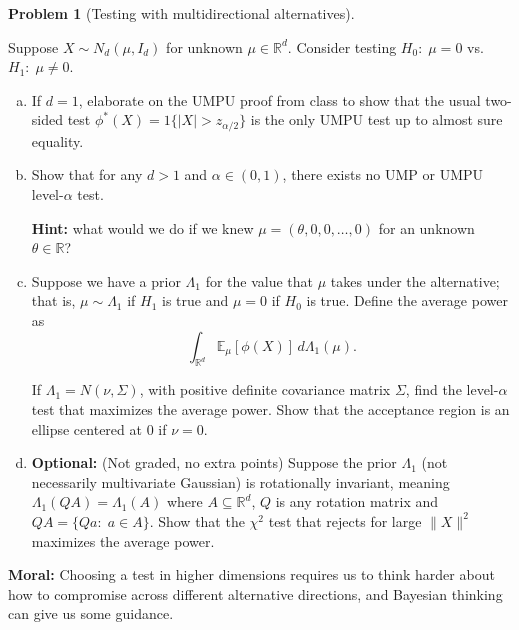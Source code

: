 \documentclass{article}
\newcommand{\EE}{\mathbb{E}}
\newcommand{\RR}{\mathbb{R}}
\newcommand{\optional}{{\bf Optional:} (Not graded, no extra points) }
\theoremstyle{definition}
\newtheorem{problem}{Problem}
\begin{document}
\begin{problem}[Testing with multidirectional alternatives]
\label{prob:test-multidir}

Suppose $X\sim N_d(\mu,I_d)$ for unknown $\mu\in\RR^d$. Consider testing $H_0:\; \mu=0$ vs. $H_1:\; \mu \neq 0$. 

\begin{enumerate}[(a)]

\item If $d=1$, elaborate on the UMPU proof from class to show that the usual two-sided test $\phi^*(X) = 1\{|X| > z_{\alpha/2}\}$ is the only UMPU test up to almost sure equality.

  
  
\item Show that for any $d>1$ and $\alpha\in(0,1)$, there exists no UMP or UMPU level-$\alpha$ test.

{\bf Hint:} what would we do if we knew $\mu = (\theta,0,0,\ldots,0)$ for an unknown $\theta\in\RR$?




\item Suppose we have a prior $\Lambda_1$ for the value that $\mu$ takes under the alternative; that is, $\mu \sim \Lambda_1$ if $H_1$ is true and $\mu = 0$ if $H_0$ is true. Define the average power as
\[
\int_{\RR^d} \EE_\mu [\phi(X)] \,d\Lambda_1(\mu).
\]

If $\Lambda_1 = N(\nu, \Sigma)$, with positive definite covariance matrix $\Sigma$, find the level-$\alpha$ test that maximizes the average power. Show that the acceptance region is an ellipse centered at $0$ if $\nu = 0$.



\item \optional Suppose the prior $\Lambda_1$ (not necessarily multivariate Gaussian) is rotationally invariant, meaning $\Lambda_1(Q A) = \Lambda_1(A)$ where $A \subseteq \RR^d$, $Q$ is any rotation matrix and $QA = \{Qa:\; a\in A\}$. Show that the $\chi^2$ test that rejects for large $\|X\|^2$ maximizes the average power.
  
  
\end{enumerate}

{\bf Moral:} Choosing a test in higher dimensions requires us to think harder about how to compromise across different alternative directions, and Bayesian thinking can give us some guidance.
\end{problem}
\end{document}
